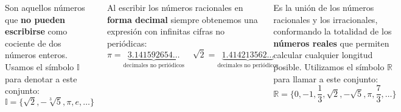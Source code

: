 \documentclass[9pt, aspectratio=169]{beamer}
\begin{document}
\begin{frame}
\begin{columns}[t]
\cx
\begin{definition}
    Son aquellos números que \textbf{no pueden escribirse} como cociente de dos números enteros. Usamos el símbolo $\mathbb{I}$ para denotar a este conjunto:
    \[ \mathbb{I} = \{ \sqrt{2}, -\sqrt[3]{5}, \pi, e, \ldots \} \]
\end{definition}

Al escribir los números racionales en \textbf{forma decimal} siempre obtenemos una expresión con infinitas cifras no periódicas:
\[ \pi = \underbrace{3.141592654\ldots}_{\text{decimales no periódicos}} \quad \sqrt{2} = \underbrace{1.414213562\ldots}_{\text{decimales no periódicos}} \]
\pause

\cx
\begin{definition}
    Es la unión de los números racionales y los irracionales, conformando la totalidad de los \textbf{números reales} que permiten calcular cualquier longitud posible. Utilizamos el símbolo $\mathbb{R}$ para llamar a este conjunto:
\[ \mathbb{R} = \{0, -1, \frac{1}{3}, \sqrt{2}, -\sqrt{5}, \pi, \frac{7}{3}, \ldots \} \]
\end{definition}
\begin{center}
    \includegraphics[scale=0.5]{figs/fig-14.pdf}
\end{center}
\end{columns}
\end{frame}
\end{document}
